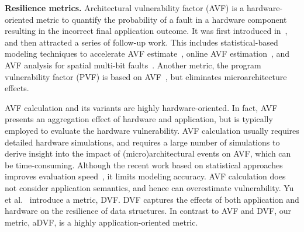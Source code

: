 \begin{spacing}{0.9}
\textbf{Resilience metrics.}
Architectural vulnerability factor (AVF) is a hardware-oriented metric
to quantify the probability of a fault in a hardware component resulting in
the incorrect final application outcome. It was first introduced  in~\cite{isca05:mukherjee, micro03:mukherjee},
and then attracted a series of follow-up work. This includes
statistical-based modeling techniques to accelerate AVF estimate~\cite{micro07:cho, hpca09:duan, mascots06:fu}, %
online AVF estimation~\cite{isca08:Li, isca07:soundararajan},  %
and AVF analysis for spatial multi-bit faults~\cite{micro14:wilkening}.
Another metric, the program vulnerability factor (PVF) is based on AVF~\cite{hpca09:sridharan}, %
but eliminates microarchitecture effects. %

AVF calculation and its variants are highly hardware-oriented. 
In fact, AVF presents an aggregation effect of hardware and application, but is typically employed to evaluate the hardware vulnerability. AVF calculation usually requires detailed hardware simulations, and requires a
large number of simulations to derive insight into the impact of (micro)architectural events on AVF, which can be time-consuming.
Although the recent work based on statistical approaches improves evaluation speed~\cite{micro07:cho, hpca09:duan, mascots06:fu}, %
it limits modeling accuracy. 
AVF calculation does not consider application semantics, and hence can overestimate vulnerability.
Yu et al.~\cite{dvf_sc14} introduce a metric, DVF. DVF 
captures the effects of both application and hardware on the resilience of data
structures. 
In contrast to AVF and DVF, our metric, aDVF, is a highly 
application-oriented metric.
\end{spacing}

\vspace{-5pt}